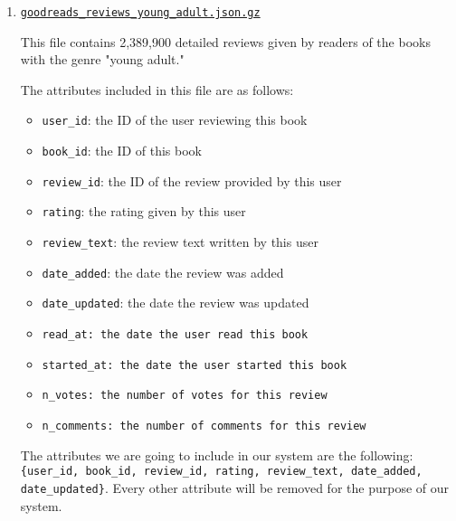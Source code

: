 \documentclass[fontsize=11pt]{article}
\begin{document}
\begin{itemize}
\begin{enumerate}
\item \texttt{\href{https://drive.google.com/uc?id=1M5iqCZ8a7rZRtsmY5KQ5rYnP9S0bQJVo}{goodreads\_reviews\_young\_adult.json.gz}}
 
This file contains 2,389,900 detailed reviews given by readers of the books with the genre "young adult."
 
The attributes included in this file are as follows:
\begin{itemize}
\item \texttt{user\_id}: the ID of the user reviewing this book 
\item \texttt{book\_id}: the ID of this book\
\item \texttt{review\_id}: the ID of the review provided by this user
\item \texttt{rating}: the rating given by this user
\item \texttt{review\_text}: the review text written by this user
\item \texttt{date\_added}: the date the review was added
\item \texttt{date\_updated}: the date the review was updated
\item \texttt{read\_at: the date the user read this book}
\item \texttt{started\_at: the date the user started this book}
\item \texttt{n\_votes: the number of votes for this review}
\item \texttt{n\_comments: the number of comments for this review}
\end{itemize}
The attributes we are going to include in our system are the following:
\texttt{\{user\_id, book\_id, review\_id, rating, review\_text, date\_added, date\_updated\}}. Every other attribute will be removed for the purpose of our system.
 

\end{enumerate}
\end{itemize}
\end{document}
